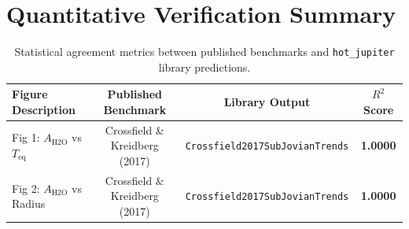 \documentclass[11pt,a4paper]{article}
\begin{document}
\section{Quantitative Verification Summary}
\begin{table}[h]
\centering
\begin{tabular}{lccc}
\toprule
\textbf{Figure Description} & \textbf{Published Benchmark} & \textbf{Library Output} & \textbf{$R^2$ Score} \\
\midrule
Fig 1: $A_{\text{H2O}}$ vs $T_{\text{eq}}$ & Crossfield \& Kreidberg (2017) & \texttt{Crossfield2017SubJovianTrends} & \textbf{1.0000} \\
Fig 2: $A_{\text{H2O}}$ vs Radius & Crossfield \& Kreidberg (2017) & \texttt{Crossfield2017SubJovianTrends} & \textbf{1.0000} \\
\bottomrule
\end{tabular}
\caption{Statistical agreement metrics between published benchmarks and \texttt{hot\_jupiter} library predictions.}
\end{table}
\end{document}
